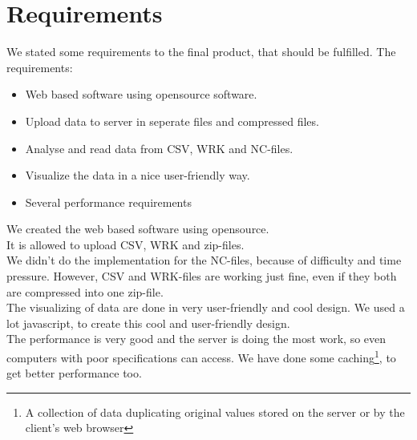 \chapter{Requirements}
We stated some requirements to the final product, that should be fulfilled. 
The requirements:
\begin{itemize}
\item Web based software using opensource software.
\item Upload data to server in seperate files and compressed files.
\item Analyse and read data from CSV, WRK and NC-files.
\item Visualize the data in a nice user-friendly way.
\item Several performance requirements
\end{itemize}
We created the web based software using opensource.\\
It is allowed to upload CSV, WRK and zip-files.\\
We didn't do the implementation for the NC-files, because of difficulty and time pressure. However, CSV and WRK-files are working just fine, even if they both are compressed into one zip-file.\\
The visualizing of data are done in very user-friendly and cool design. We used a lot javascript, to create this cool and user-friendly design.\\
The performance is very good and the server is doing the most work, so even computers with poor specifications can access. We have done some caching\footnote{A collection of data duplicating original values stored on the server or by the client's web browser}, to get better performance too.\\
